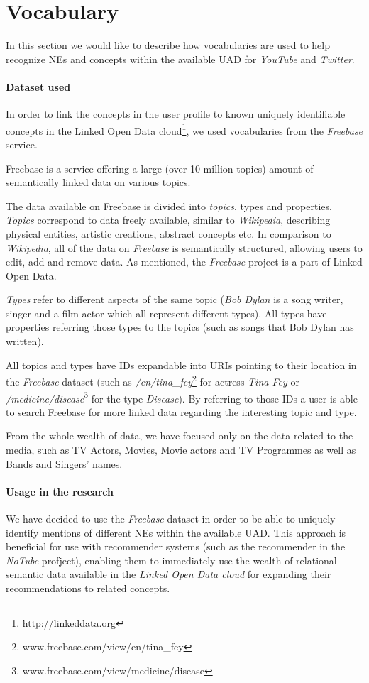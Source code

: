 \section{Vocabulary}
\label{sec:vocabulary}
In this section we would like to describe how vocabularies are used to help recognize NEs and concepts within
the available UAD for \textit{YouTube} and \textit{Twitter}.

\paragraph{Dataset used}
In order to link the concepts in the user profile to known uniquely identifiable concepts in the Linked Open Data
cloud\footnote{http://linkeddata.org}, we used vocabularies from the \textit{Freebase} service.

Freebase is a service offering a large (over 10 million topics) amount of semantically linked data on various topics.

The data available on Freebase is divided into \textit{topics}, types and properties. \textit{Topics} correspond to data
freely available, similar to \textit{Wikipedia}, describing physical entities, artistic creations, abstract concepts
etc. In comparison to \textit{Wikipedia}, all of the data on \textit{Freebase} is semantically structured,
allowing users to edit, add and remove data. As mentioned, the \textit{Freebase} project is a part of Linked Open Data.

\textit{Types} refer to different aspects of the same topic (\eg \textit{Bob Dylan} is a song writer,
singer and a film actor which all represent different types). All types have properties referring those
types to the topics (such as songs that Bob Dylan has written).

All topics and types have IDs expandable into URIs pointing to their location in the \textit{Freebase} dataset
(such as \textit{/en/tina\_fey}\footnote{www.freebase.com/view/en/tina\_fey} for actress \textit{Tina Fey}
or \textit{/medicine/disease}\footnote{www.freebase.com/view/medicine/disease} for the type \textit{Disease}).
By referring to those IDs a user is able to search Freebase for more linked data regarding the interesting topic and type.

From the whole wealth of data, we have focused only on the data related to the media, such as TV Actors, Movies, Movie
actors and TV Programmes as well as Bands and Singers' names.

\paragraph{Usage in the research}
We have decided to use the \textit{Freebase} dataset in order to be able to uniquely identify mentions of different NEs
within the available UAD. This approach is beneficial for use with recommender systems (such as the recommender
in the \textit{NoTube} profject), enabling them to immediately use the wealth of relational semantic data available
in the \textit{Linked Open Data cloud} for expanding their recommendations to related concepts.
